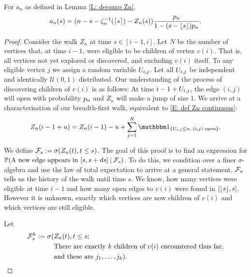 \begin{lemma} \label{L: formula an}
	For $a_n$ as defined in Lemma \ref{L: decomp Zn},
	\begin{equation}
	a_n(s) = (n - s - \zeta^{-1}_n(\lceil s\rceil) - Z_n(s)) \frac{p_n}{1-(s-\lfloor s\rfloor)p_n} .
	\end{equation}
\end{lemma}

\begin{proof} \label{P: formula an}
	Consider the walk $Z_n$ at time $s\in[i-1, i]$.
	Let $N$ be the number of vertices that, at time $i-1$, were eligible to be children of vertex $v(i)$.
	That is, all vertices not yet explored or discovered, and excluding $v(i)$ itself.
	To any eligible vertex $j$ we assign a random variable $U_{i,j}$.
	Let all $U_{i,j}$ be independent and identically $\mathcal{U}(0,1)$ distributed.
	Our understanding of the process of discovering children of $v(i)$ is as follows:
	At time $i-1+U_{i,j}$, the edge $(i,j)$ will open with probability $p_n$ and
	$Z_n$ will make a jump of size $1$.
	We arrive at a characterisation of our breadth-first walk, 
	equivalent to \eqref{E: def Zn continuous}:	
	\begin{equation}
	Z_n(i-1+u) = Z_n(i-1) - u + \sum_{j=1}^{N} \Ind{\{\Uij \leq u, \; (i,j) \; \text{open}\}}.
	\end{equation}
	
	We define $\mathcal{F}_s := \sigma(Z_n(t), t\leq s)$.
	The goal of this proof is to find an expression for
	$\mathbb{P}(\text{A new edge appears in $[s, s+ds]$} \: | \: \mathcal{F}_s)$.
	To do this, we condition over a finer $\sigma$-algebra and use the law of total expectation to arrive at a general statement.
	$\mathcal{F}_s$ tells us the history of the walk until time $s$. 
	We know, how many vertices were eligible at time $i-1$ and how many open edges to $v(i)$ were found in $[\lfloor s\rfloor,s]$.
	However it is unknown, exactly which vertices are now children of $v(i)$ and which vertices are still eligible.
	
	Let 
	\begin{equation}
	\begin{split}
	\mathcal{F}_s^k := \sigma(&Z_n(t), t\leq s; \\
	&\text{There are exactly $k$ children of $v(i)$ encountered thus far}, \\
	&\text{and these are $j_1, \dots, j_k$}).
	\end{split}
	\end{equation}
	

\end{proof}
